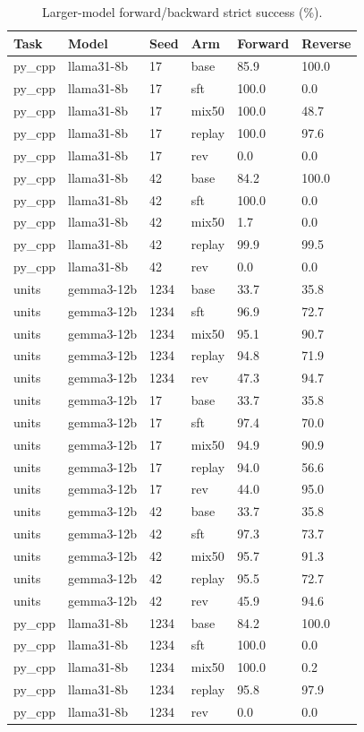 \begin{table}[t]
\centering\small
\begin{tabular}{llllll}
\toprule
Task & Model & Seed & Arm & Forward & Reverse \\
\midrule
py\_cpp & llama31-8b & 17 & base & 85.9 & 100.0 \\
py\_cpp & llama31-8b & 17 & sft & 100.0 & 0.0 \\
py\_cpp & llama31-8b & 17 & mix50 & 100.0 & 48.7 \\
py\_cpp & llama31-8b & 17 & replay & 100.0 & 97.6 \\
py\_cpp & llama31-8b & 17 & rev & 0.0 & 0.0 \\
py\_cpp & llama31-8b & 42 & base & 84.2 & 100.0 \\
py\_cpp & llama31-8b & 42 & sft & 100.0 & 0.0 \\
py\_cpp & llama31-8b & 42 & mix50 & 1.7 & 0.0 \\
py\_cpp & llama31-8b & 42 & replay & 99.9 & 99.5 \\
py\_cpp & llama31-8b & 42 & rev & 0.0 & 0.0 \\
units & gemma3-12b & 1234 & base & 33.7 & 35.8 \\
units & gemma3-12b & 1234 & sft & 96.9 & 72.7 \\
units & gemma3-12b & 1234 & mix50 & 95.1 & 90.7 \\
units & gemma3-12b & 1234 & replay & 94.8 & 71.9 \\
units & gemma3-12b & 1234 & rev & 47.3 & 94.7 \\
units & gemma3-12b & 17 & base & 33.7 & 35.8 \\
units & gemma3-12b & 17 & sft & 97.4 & 70.0 \\
units & gemma3-12b & 17 & mix50 & 94.9 & 90.9 \\
units & gemma3-12b & 17 & replay & 94.0 & 56.6 \\
units & gemma3-12b & 17 & rev & 44.0 & 95.0 \\
units & gemma3-12b & 42 & base & 33.7 & 35.8 \\
units & gemma3-12b & 42 & sft & 97.3 & 73.7 \\
units & gemma3-12b & 42 & mix50 & 95.7 & 91.3 \\
units & gemma3-12b & 42 & replay & 95.5 & 72.7 \\
units & gemma3-12b & 42 & rev & 45.9 & 94.6 \\
py\_cpp & llama31-8b & 1234 & base & 84.2 & 100.0 \\
py\_cpp & llama31-8b & 1234 & sft & 100.0 & 0.0 \\
py\_cpp & llama31-8b & 1234 & mix50 & 100.0 & 0.2 \\
py\_cpp & llama31-8b & 1234 & replay & 95.8 & 97.9 \\
py\_cpp & llama31-8b & 1234 & rev & 0.0 & 0.0 \\
\bottomrule
\end{tabular}
\caption{Larger-model forward/backward strict success (\%).}
\label{tab:generality-snapshot}
\end{table}
